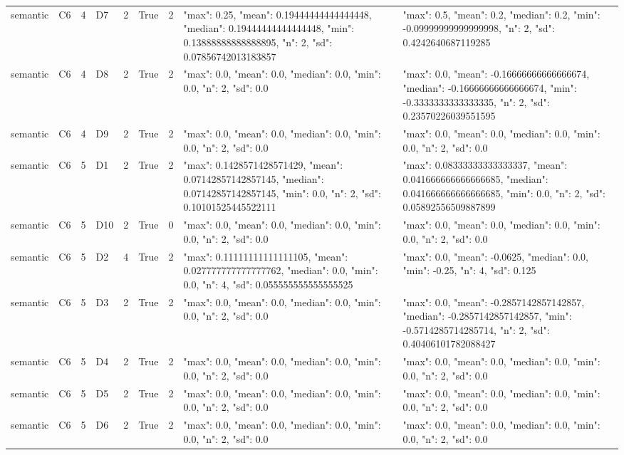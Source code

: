 \begin{tabular}{lllllllll}
semantic & C6 & 4 & D7 & 2 & True & 2 & {"max": 0.25, "mean": 0.19444444444444448, "median": 0.19444444444444448, "min": 0.13888888888888895, "n": 2, "sd": 0.07856742013183857} & {"max": 0.5, "mean": 0.2, "median": 0.2, "min": -0.09999999999999998, "n": 2, "sd": 0.4242640687119285} \\
semantic & C6 & 4 & D8 & 2 & True & 2 & {"max": 0.0, "mean": 0.0, "median": 0.0, "min": 0.0, "n": 2, "sd": 0.0} & {"max": 0.0, "mean": -0.16666666666666674, "median": -0.16666666666666674, "min": -0.3333333333333335, "n": 2, "sd": 0.23570226039551595} \\
semantic & C6 & 4 & D9 & 2 & True & 2 & {"max": 0.0, "mean": 0.0, "median": 0.0, "min": 0.0, "n": 2, "sd": 0.0} & {"max": 0.0, "mean": 0.0, "median": 0.0, "min": 0.0, "n": 2, "sd": 0.0} \\
semantic & C6 & 5 & D1 & 2 & True & 2 & {"max": 0.1428571428571429, "mean": 0.07142857142857145, "median": 0.07142857142857145, "min": 0.0, "n": 2, "sd": 0.10101525445522111} & {"max": 0.08333333333333337, "mean": 0.041666666666666685, "median": 0.041666666666666685, "min": 0.0, "n": 2, "sd": 0.05892556509887899} \\
semantic & C6 & 5 & D10 & 2 & True & 0 & {"max": 0.0, "mean": 0.0, "median": 0.0, "min": 0.0, "n": 2, "sd": 0.0} & {"max": 0.0, "mean": 0.0, "median": 0.0, "min": 0.0, "n": 2, "sd": 0.0} \\
semantic & C6 & 5 & D2 & 4 & True & 2 & {"max": 0.11111111111111105, "mean": 0.027777777777777762, "median": 0.0, "min": 0.0, "n": 4, "sd": 0.055555555555555525} & {"max": 0.0, "mean": -0.0625, "median": 0.0, "min": -0.25, "n": 4, "sd": 0.125} \\
semantic & C6 & 5 & D3 & 2 & True & 2 & {"max": 0.0, "mean": 0.0, "median": 0.0, "min": 0.0, "n": 2, "sd": 0.0} & {"max": 0.0, "mean": -0.2857142857142857, "median": -0.2857142857142857, "min": -0.5714285714285714, "n": 2, "sd": 0.40406101782088427} \\
semantic & C6 & 5 & D4 & 2 & True & 2 & {"max": 0.0, "mean": 0.0, "median": 0.0, "min": 0.0, "n": 2, "sd": 0.0} & {"max": 0.0, "mean": 0.0, "median": 0.0, "min": 0.0, "n": 2, "sd": 0.0} \\
semantic & C6 & 5 & D5 & 2 & True & 2 & {"max": 0.0, "mean": 0.0, "median": 0.0, "min": 0.0, "n": 2, "sd": 0.0} & {"max": 0.0, "mean": 0.0, "median": 0.0, "min": 0.0, "n": 2, "sd": 0.0} \\
semantic & C6 & 5 & D6 & 2 & True & 2 & {"max": 0.0, "mean": 0.0, "median": 0.0, "min": 0.0, "n": 2, "sd": 0.0} & {"max": 0.0, "mean": 0.0, "median": 0.0, "min": 0.0, "n": 2, "sd": 0.0} \\

\end{tabular}
